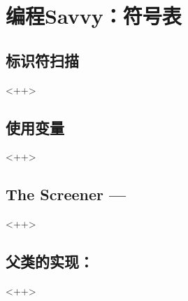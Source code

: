 

\chapter{编程Savvy：符号表}

\section{标识符扫描}<++>

\section{使用变量}<++>

\section{The Screener ---}<++>

\section{父类的实现：}<++>

